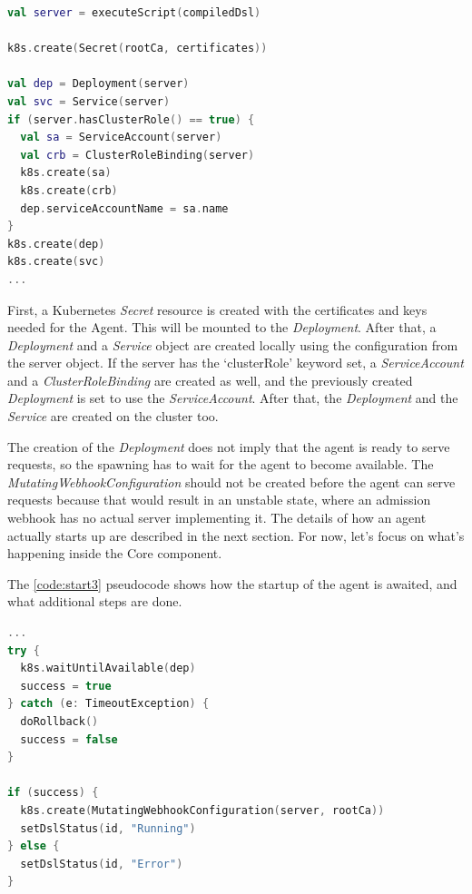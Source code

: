 \begin{minipage}{\linewidth}
\begin{lstlisting}[caption={Spawning of an agent},language=Kotlin,label=code:start2]
val server = executeScript(compiledDsl)

k8s.create(Secret(rootCa, certificates))

val dep = Deployment(server)
val svc = Service(server)
if (server.hasClusterRole() == true) {
  val sa = ServiceAccount(server)
  val crb = ClusterRoleBinding(server)
  k8s.create(sa)
  k8s.create(crb)
  dep.serviceAccountName = sa.name
}
k8s.create(dep)
k8s.create(svc)
...
\end{lstlisting}
\end{minipage}

First, a Kubernetes \emph{Secret} resource is created with the certificates and keys needed for the Agent. This will be mounted to the \emph{Deployment}.
After that, a \emph{Deployment} and a \emph{Service} object are created locally using the configuration from the server object. If the server has the `clusterRole' keyword set, a \emph{ServiceAccount} and a \emph{ClusterRoleBinding} are created as well, and the previously created \emph{Deployment} is set to use the \emph{ServiceAccount}. After that, the \emph{Deployment} and the \emph{Service} are created on the cluster too.

The creation of the \emph{Deployment} does not imply that the agent is ready to serve requests, so the spawning has to wait for the agent to become available. The \emph{MutatingWebhookConfiguration} should not be created before the agent can serve requests because that would result in an unstable state, where an admission webhook has no actual server implementing it. The details of how an agent actually starts up are described in the next section. For now, let's focus on what's happening inside the Core component.

The \ref{code:start3} pseudocode shows how the startup of the agent is awaited, and what additional steps are done.

\begin{minipage}{\linewidth}
\begin{lstlisting}[caption={Spawning of an agent},language=Kotlin,label=code:start3]
...
try {
  k8s.waitUntilAvailable(dep)
  success = true
} catch (e: TimeoutException) {
  doRollback()
  success = false
}
        
if (success) {
  k8s.create(MutatingWebhookConfiguration(server, rootCa))
  setDslStatus(id, "Running")
} else {
  setDslStatus(id, "Error")
}
\end{lstlisting}
\end{minipage}

